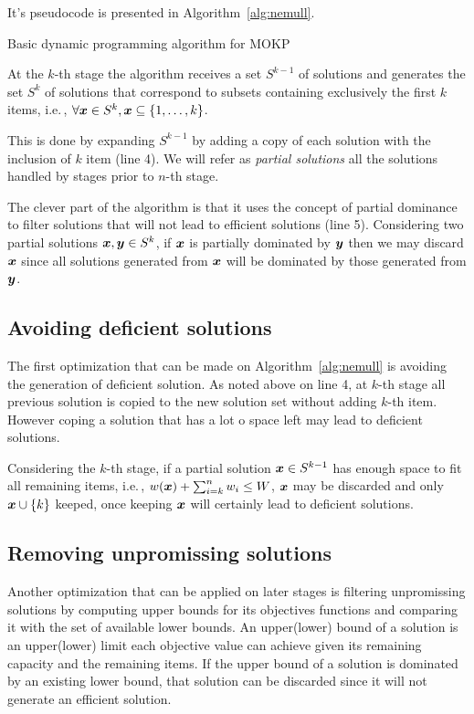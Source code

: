 It's pseudocode is presented in Algorithm~\ref{alg:nemull}.
\begin{algorithm}
  \caption{Basic dynamic programming algorithm for MOKP}
  \label{alg:nemull}
  
\end{algorithm}
At the $k$-th stage the algorithm receives a set $S^{k-1}$ of solutions and
generates the set $S^k$ of solutions that correspond
to subsets containing exclusively the first $k$ items, i.e.\,,
$\forall\boldsymbol{x} \in S^k, \boldsymbol{x} \subseteq \{1, \ldots, k\}$.

This is done by expanding $S^{k-1}$ by adding a copy of each solution with the
inclusion of $k$ item (line 4).
We will refer as \emph{partial solutions} all the solutions handled by 
stages prior to $n$-th stage.

The clever part of the algorithm is that it uses the concept of partial dominance
to filter solutions that will not lead to efficient solutions (line 5).
Considering two partial solutions $\boldsymbol{x}, \boldsymbol{y} \in S^k$, if
$\boldsymbol{x}$ is partially dominated by $\boldsymbol{y}$ then we may discard $\boldsymbol{x}$ since all
solutions generated from $\boldsymbol{x}$ will be dominated by those generated from $\boldsymbol{y}$.

\subsection{Avoiding deficient solutions}

The first optimization that can be made on Algorithm~\ref{alg:nemull} is
avoiding the generation of deficient solution.
As noted above on line 4, at $k$-th stage all previous solution is copied to the
new solution set without adding $k$-th item.
However coping a solution that has a lot o space left may lead to deficient
solutions.

Considering the $k$-th stage, if a partial solution $\boldsymbol{x} \in S^{k-1}$ has enough
space to fit all remaining items, i.e.\,, $w(\boldsymbol{x}) + \sum_{i=k}^n w_i \leq W$,
$\boldsymbol{x}$ may be discarded and only $\boldsymbol{x} \cup \{k\}$ keeped, once
keeping $\boldsymbol{x}$ will certainly lead to deficient solutions.

\subsection{Removing unpromissing solutions}

Another optimization that can be applied on later stages is
filtering unpromissing solutions by computing upper bounds for its objectives
functions and comparing it with the set of available lower bounds.
An upper(lower) bound of a solution is an upper(lower) limit each objective
value can achieve given its remaining capacity and the remaining items.
If the upper bound of a solution is dominated by an existing lower bound,
that solution can be discarded since it will not generate an efficient solution.

